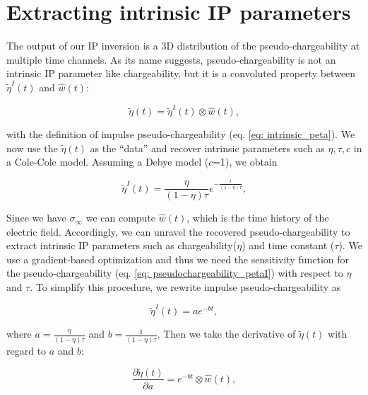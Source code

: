\documentclass[extra,mreferee]{gji}
\newcommand{\siginf}{\sigma_\infty}
\newcommand{\peta}{\tilde{\eta}}
\begin{document}
\section{Extracting intrinsic IP parameters}
\label{section: extract_intrinsicIP}
The output of our IP inversion is a 3D distribution of the pseudo-chargeability at multiple time channels. 
As its name suggests, pseudo-chargeability is not an intrinsic IP parameter like chargeability, but it is a convoluted property between $\peta^{I}(t)$ and $\hat{w}(t)$:
\begin{linenomath*}
\begin{equation}
  \peta(t) = \peta^{I}(t) \otimes \hat{w}(t),
  \label{eq: pseudochargeability_petaI}
\end{equation}
\end{linenomath*}
with the definition of impulse pseudo-chargeability (eq. \ref{eq: intrinsic_peta}).
We now use the $\peta(t)$ as the “data” and recover intrinsic parameters such as $\eta, \tau, c$ in a Cole-Cole model. Assuming a Debye model ($c$=1), we obtain
\begin{linenomath*}
\begin{equation}
    \peta^{I}(t) = \frac{\eta}{(1-\eta)\tau}e^{-\frac{t}{(1-\eta)\tau}},
    \label{eq: intrinsic_peta_debye}
\end{equation}
\end{linenomath*}
Since we have $\siginf$ we can compute $\hat{w}(t)$, which is the time history of the electric field. 
Accordingly, we can unravel the recovered pseudo-chargeability to extract intrinsic IP parameters such as chargeability($\eta$) and time constant ($\tau$). 
We use a gradient-based optimization and thus we need the sensitivity function for the pseudo-chargeability (eq. \ref{eq: pseudochargeability_petaI}) with respect to $\eta$ and $\tau$. 
To simplify this procedure, we rewrite impulse pseudo-chargeability as 
\begin{linenomath*}
\begin{equation}
  \peta^{I}(t) = a e^{-bt},
\end{equation}
\end{linenomath*}
where $a = \frac{\eta}{(1-\eta)\tau}$ and $b = \frac{1}{(1-\eta)\tau}$. 
Then we take the derivative of $\peta(t)$ with regard to $a$ and $b$:
\begin{linenomath*}
\begin{equation}
  \frac{\partial \peta(t)}{\partial a} = e^{-bt} \otimes \hat{w}(t),
\end{equation}
\end{linenomath*}
\end{document}
